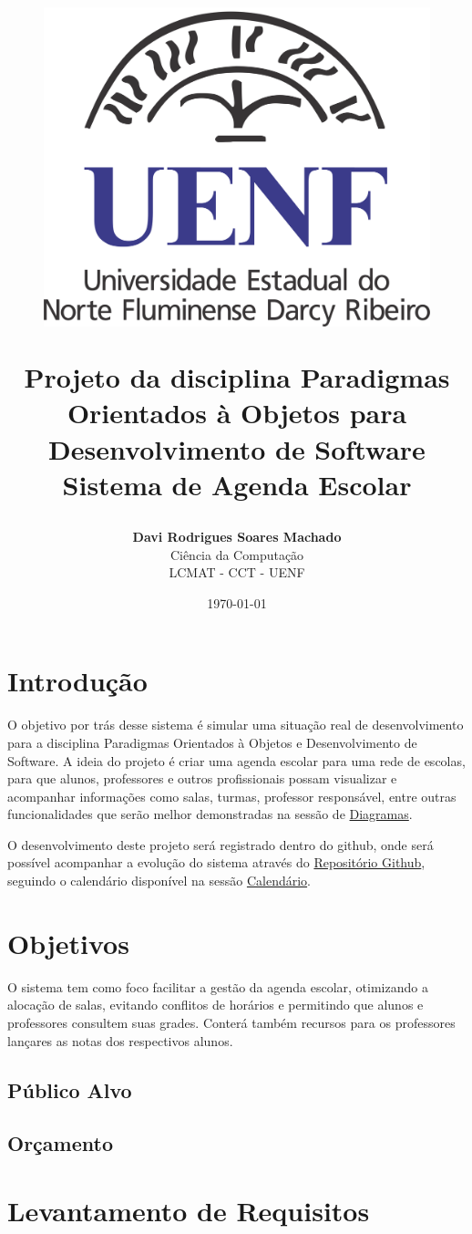 \documentclass[12pt,a4paper]{report}
\title{
	\begin{figure}
	\centering
	\includegraphics[scale=0.3]{imagens/uenf1.png}
	\end{figure}
    \vspace{1cm}
    \Huge \textbf{Projeto da disciplina Paradigmas Orientados à Objetos para Desenvolvimento de Software} \\[0.5cm]
    \Large Sistema de Agenda Escolar
    \vspace{2cm}
}
\author{\textbf{Davi Rodrigues Soares Machado} \\ Ciência da Computação \\ LCMAT - CCT - UENF}
\date{\today}
\begin{document}
\maketitle
\newpage

\tableofcontents
\newpage









\chapter{Introdução}
O objetivo por trás desse sistema é simular uma situação real de desenvolvimento para a disciplina Paradigmas Orientados à Objetos e Desenvolvimento de Software. A ideia do projeto é criar uma agenda escolar para uma rede de escolas, para que alunos, professores e outros profissionais possam visualizar e acompanhar informações como salas, turmas, professor responsável, entre outras funcionalidades que serão melhor demonstradas na sessão de \hyperref[sec:DCU]{Diagramas}. 


O desenvolvimento deste projeto será registrado dentro do github, onde será possível acompanhar a evolução do sistema através do \href{https://github.com/DaviRodrish/Projeto-PooDev---Agenda-Escolar}{Repositório Github}, seguindo o calendário disponível na sessão \hyperref[sec:Calendario]{Calendário}.


\chapter{Objetivos}
O sistema tem como foco facilitar a gestão da agenda escolar, otimizando a alocação de salas, evitando conflitos de horários e permitindo que alunos e professores consultem suas grades. Conterá também recursos para os professores lançares as notas dos respectivos alunos. 
\section{Público Alvo}

\section{Orçamento}
\chapter{Levantamento de Requisitos}
\end{document}
